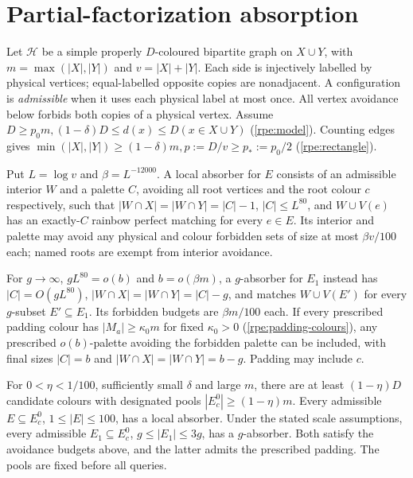 \section{Partial-factorization absorption}
\label{rpe:section}\label{ent:section}
Let $\mathcal{H}$ be a simple properly $D$-coloured bipartite graph on $X\cup{}Y$, with $m=\max(|X|,|Y|)$ and $v=|X|+|Y|$. Each side is injectively labelled by physical vertices; equal-labelled
opposite copies are nonadjacent. A configuration is \emph{admissible}
when it uses each physical label at most once. All vertex avoidance
below forbids both copies of a physical vertex. Assume \label{rpe:model}$D\ge{}p_0m,(1-\delta)D\le{}d(x)\le{}D(x\in{}X\cup{}Y)$ \textup{(\ref{rpe:model})}. Counting edges gives \label{rpe:rectangle}$\min(|X|,|Y|)\ge(1-\delta)m,p:=D/v\ge{}p_*:=p_0/2$ \textup{(\ref{rpe:rectangle})}.

Put $L=\log{}v$ and $\beta=L^{-12000}$. A local absorber for $E$ consists of an admissible interior $W$ and a palette $C$, avoiding all root vertices and the root colour $c$ respectively, such that $|W\cap{}X|=|W\cap{}Y|=|C|-1$, $|C|\le{}L^{80}$, and $W\cup{}V(e)$ has an exactly-$C$ rainbow perfect matching for every $e\in{}E$. Its interior and palette may avoid any physical and colour forbidden sets of size at most $\beta{}v/100$ each; named roots are exempt from interior avoidance.

For $g\to\infty$, $gL^{80}=o(b)$ and $b=o(\beta{}m)$, a $g$-absorber for $E_1$ instead has $|C|=O(gL^{80})$, $|W\cap{}X|=|W\cap{}Y|=|C|-g$, and matches $W\cup{}V(E')$ for every $g$-subset $E'\subseteq{}E_1$. Its forbidden budgets are $\beta{}m/100$ each. If every prescribed padding colour has $|M_a|\ge\kappa_0m$ for fixed $\kappa_0>0$ \label{rpe:padding-colours}\textup{(\ref{rpe:padding-colours})}, any prescribed $o(b)$-palette avoiding the forbidden palette can be included, with final sizes $|C|=b$ and $|W\cap{}X|=|W\cap{}Y|=b-g$. Padding may include $c$.

\begin{theorem}\label{rpe:theorem}\label{ent:local-absorber}
For $0<\eta<1/100$, sufficiently small $\delta$ and large $m$, there are at least $(1-\eta)D$ candidate colours with designated pools $|E_c^0|\ge(1-\eta)m$. Every admissible $E\subseteq{}E_c^0$, $1\le|E|\le100$, has a local absorber. Under the stated scale assumptions, every admissible $E_1\subseteq{}E_c^0$, $g\le|E_1|\le3g$, has a $g$-absorber. Both satisfy the avoidance budgets above, and the latter admits the prescribed padding. The pools are fixed before all queries.
\end{theorem}

